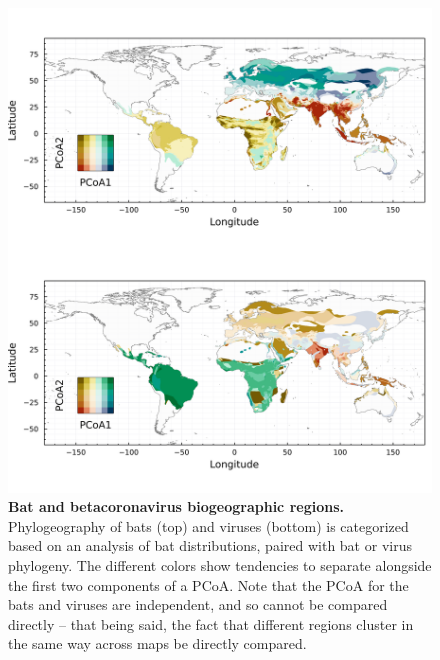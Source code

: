 \documentclass[10pt,oneside]{article}
\makeatletter
\def\maxwidth{\ifdim\Gin@nat@width>\linewidth\linewidth
\else\Gin@nat@width\fi}
\let\Oldincludegraphics\includegraphics
\renewcommand{\includegraphics}[1]{\Oldincludegraphics[width=\maxwidth]{#1}}
\makeatother
\begin{document}
\begin{figure}
\hypertarget{fig:biogeo}{%
\centering
\includegraphics{figures/combined_biogeo.png}
\caption{\textbf{Bat and betacoronavirus biogeographic regions.}
Phylogeography of bats (top) and viruses (bottom) is categorized based
on an analysis of bat distributions, paired with bat or virus phylogeny.
The different colors show tendencies to separate alongside the first two
components of a PCoA. Note that the PCoA for the bats and viruses are
independent, and so cannot be compared directly -- that being said, the
fact that different regions cluster in the same way across maps be
directly compared.}\label{fig:biogeo}
}
\end{figure}
\end{document}
